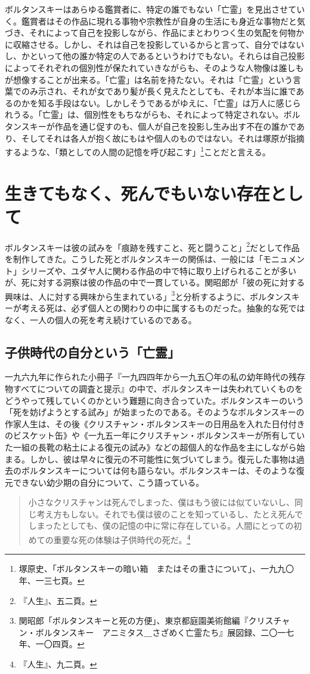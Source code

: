 \documentclass[b5j,twoside,twocolumn]{utarticle}
\begin{document}
ボルタンスキーはあらゆる鑑賞者に、特定の誰でもない「亡霊」を見出させていく。鑑賞者はその作品に現れる事物や宗教性が自身の生活にも身近な事物だと気づき、それによって自己を投影しながら、作品にまとわりつく生の気配を何物かに収縮させる。しかし、それは自己を投影しているからと言って、自分ではないし、かといって他の誰か特定の人であるというわけでもない。それらは自己投影によってそれぞれの個別性が保たれていきながらも、そのような人物像は誰しもが想像することが出来る。「亡霊」は名前を持たない。それは「亡霊」という言葉でのみ示され、それが女であり髪が長く見えたとしても、それが本当に誰であるのかを知る手段はない。しかしそうであるがゆえに、「亡霊」は万人に感じられうる。「亡霊」は、個別性をもちながらも、それによって特定されない。ボルタンスキーが作品を通じ促すのも、個人が自己を投影し生み出す不在の誰かであり、そしてそれは各人が抱く故にもはや個人のものではない。それは塚原が指摘するような、「類としての人間の記憶を呼び起こす」\footnote{塚原史、「ボルタンスキーの暗い箱　またはその重さについて」、一九九〇年、一三七頁。}ことだと言える。

\section{生きてもなく、死んでもいない存在として}
ボルタンスキーは彼の試みを「痕跡を残すこと、死と闘うこと」\footnote{『人生』、五二頁。}だとして作品を制作してきた。こうした死とボルタンスキーの関係は、一般には「モニュメント」シリーズや、ユダヤ人に関わる作品の中で特に取り上げられることが多いが、死に対する洞察は彼の作品の中で一貫している。関昭郎が「彼の死に対する興味は、人に対する興味から生まれている」\footnote{関昭郎「ボルタンスキーと死の方便」、東京都庭園美術館編『クリスチャン・ボルタンスキー　アニミタス＿さざめく亡霊たち』展図録、二〇一七年、一〇四頁。}と分析するように、ボルタンスキーが考える死は、必ず個人との関わりの中に属するものだった。抽象的な死ではなく、一人の個人の死を考え続けているのである。
\subsection{子供時代の自分という「亡霊」}
一九六九年に作られた小冊子『一九四四年から一九五〇年の私の幼年時代の残存物すべてについての調査と提示』の中で、ボルタンスキーは失われていくものをどうやって残していくのかという難題に向き合っていた。ボルタンスキーのいう「死を妨げようとする試み」が始まったのである。そのようなボルタンスキーの作家人生は、その後《クリスチャン・ボルタンスキーの日用品を入れた日付付きのビスケット缶》や《一九五一年にクリスチャン・ボルタンスキーが所有していた一組の長靴の粘土による復元の試み》などの超個人的な作品を主にしながら始まる。しかし、彼は早々に復元の不可能性に気づいてしまう。復元した事物は過去のボルタンスキーについては何も語らない。ボルタンスキーは、そのような復元できない幼少期の自分について、こう語っている。
\begin{quote}
小さなクリスチャンは死んでしまった、僕はもう彼には似ていないし、同じ考え方もしない。それでも僕は彼のことを知っているし、たとえ死んでしまったとしても、僕の記憶の中に常に存在している。人間にとっての初めての重要な死の体験は子供時代の死だ。\footnote{『人生』、九二頁。}
\end{quote}
\end{document}
